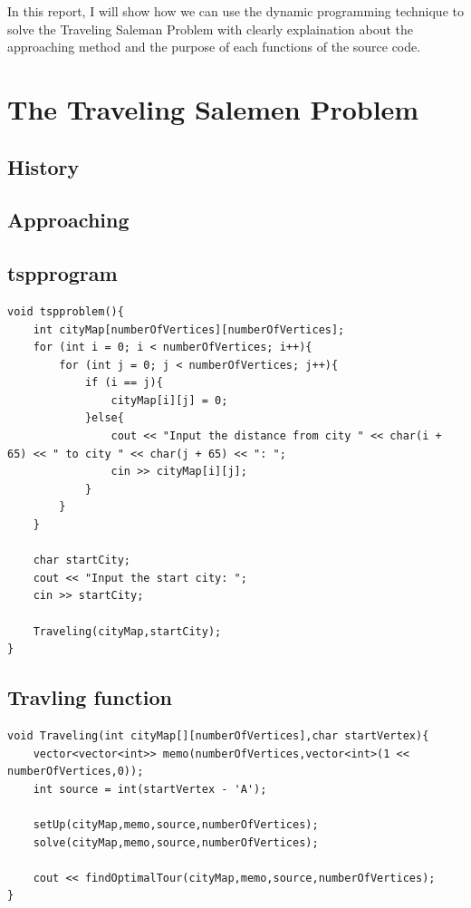 \documentclass[a4paper]{article}
\begin{document}
In this report, I will show how we can use the dynamic programming technique to solve the Traveling Saleman Problem with clearly explaination about the approaching method and the purpose of each functions of the source code. 

\section{The Traveling Salemen Problem}
\subsection{History}

\subsection{Approaching}

\subsection{tspprogram}

\begin{verbatim}
void tspproblem(){
    int cityMap[numberOfVertices][numberOfVertices];
    for (int i = 0; i < numberOfVertices; i++){
        for (int j = 0; j < numberOfVertices; j++){
            if (i == j){
                cityMap[i][j] = 0;
            }else{
                cout << "Input the distance from city " << char(i + 65) << " to city " << char(j + 65) << ": ";
                cin >> cityMap[i][j];
            }
        } 
    }

    char startCity;
    cout << "Input the start city: ";
    cin >> startCity;

    Traveling(cityMap,startCity);
}
\end{verbatim}
\subsection{Travling function}
\begin{verbatim}
void Traveling(int cityMap[][numberOfVertices],char startVertex){
    vector<vector<int>> memo(numberOfVertices,vector<int>(1 << numberOfVertices,0));
    int source = int(startVertex - 'A');

    setUp(cityMap,memo,source,numberOfVertices);
    solve(cityMap,memo,source,numberOfVertices);
    
    cout << findOptimalTour(cityMap,memo,source,numberOfVertices);
}
\end{verbatim}
\end{document}
